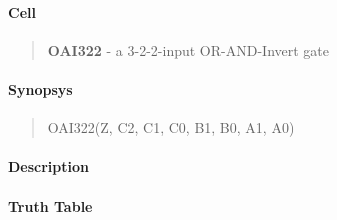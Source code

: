 \label{OAI322}
\paragraph{Cell}
\begin{quote}
    \textbf{OAI322} - a 3-2-2-input OR-AND-Invert gate
\end{quote}

\paragraph{Synopsys}
\begin{quote}
    OAI322(Z, C2, C1, C0, B1, B0, A1, A0)
\end{quote}

\paragraph{Description}

%

\paragraph{Truth Table}


